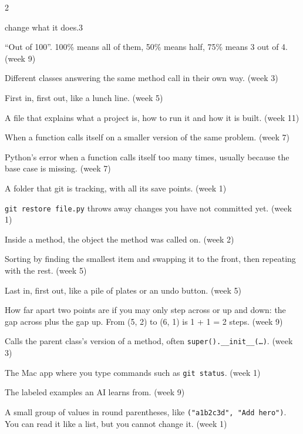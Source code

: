 \documentclass[level=3]{kidscode}
\newcommand{\term}[3]{\item[#1] #2 \textcolor{kcgray}{\small(week #3)}}
\begin{document}
\begin{multicols}{2}
\begin{description}[leftmargin=0pt,itemsep=3pt,font=\bfseries]
{change what it does.}{3}
\term{percent (\%)}{\enquote{Out of 100}. 100\% means all of them, 50\% means half, 75\% means 3 out of 4.}{9}
\term{polymorphism}{Different classes answering the same method call in their own way.}{3}
\term{queue}{First in, first out, like a lunch line.}{5}
\term{README}{A file that explains what a project is, how to run it and how it is built.}{11}
\term{recursion}{When a function calls itself on a smaller version of the same problem.}{7}
\term{RecursionError}{Python's error when a function calls itself too many times, usually because
the base case is missing.}{7}
\term{repository (repo)}{A folder that git is tracking, with all its save points.}{1}
\term{restore}{\texttt{git restore file.py} throws away changes you have not committed yet.}{1}
\term{\texttt{self}}{Inside a method, the object the method was called on.}{2}
\term{selection sort}{Sorting by finding the smallest item and swapping it to the front, then
repeating with the rest.}{5}
\term{stack}{Last in, first out, like a pile of plates or an undo button.}{5}
\term{steps distance}{How far apart two points are if you may only step across or up and down: the
gap across plus the gap up. From (5, 2) to (6, 1) is 1 + 1 = 2 steps.}{9}
\term{\texttt{super()}}{Calls the parent class's version of a method, often
\texttt{super().\_\_init\_\_(\ldots)}.}{3}
\term{Terminal}{The Mac app where you type commands such as \texttt{git status}.}{1}
\term{training data}{The labeled examples an AI learns from.}{9}
\term{tuple}{A small group of values in round parentheses, like \texttt{("a1b2c3d", "Add hero")}.
You can read it like a list, but you cannot change it.}{1}
\end{description}
\end{multicols}
\end{document}
